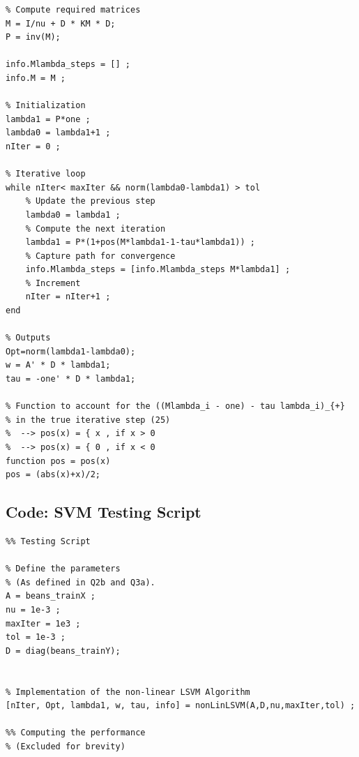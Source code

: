 \documentclass{article}
\begin{document}
\begin{appendices}
\begin{verbatim}
% Compute required matrices
M = I/nu + D * KM * D;
P = inv(M);

info.Mlambda_steps = [] ;
info.M = M ; 

% Initialization
lambda1 = P*one ;
lambda0 = lambda1+1 ;
nIter = 0 ;

% Iterative loop
while nIter< maxIter && norm(lambda0-lambda1) > tol
    % Update the previous step
    lambda0 = lambda1 ;
    % Compute the next iteration
    lambda1 = P*(1+pos(M*lambda1-1-tau*lambda1)) ;
    % Capture path for convergence
    info.Mlambda_steps = [info.Mlambda_steps M*lambda1] ;
    % Increment 
    nIter = nIter+1 ;
end

% Outputs
Opt=norm(lambda1-lambda0);
w = A' * D * lambda1;
tau = -one' * D * lambda1;

% Function to account for the ((Mlambda_i - one) - tau lambda_i)_{+} 
% in the true iterative step (25)
%  --> pos(x) = { x , if x > 0
%  --> pos(x) = { 0 , if x < 0
function pos = pos(x)
pos = (abs(x)+x)/2;
\end{verbatim}

\newpage
\subsection*{Code: SVM Testing Script}
\small
\begin{verbatim}
%% Testing Script

% Define the parameters
% (As defined in Q2b and Q3a).
A = beans_trainX ;
nu = 1e-3 ;
maxIter = 1e3 ; 
tol = 1e-3 ;
D = diag(beans_trainY);


% Implementation of the non-linear LSVM Algorithm
[nIter, Opt, lambda1, w, tau, info] = nonLinLSVM(A,D,nu,maxIter,tol) ;

%% Computing the performance
% (Excluded for brevity)

\end{verbatim}

\end{appendices}
\end{document}
